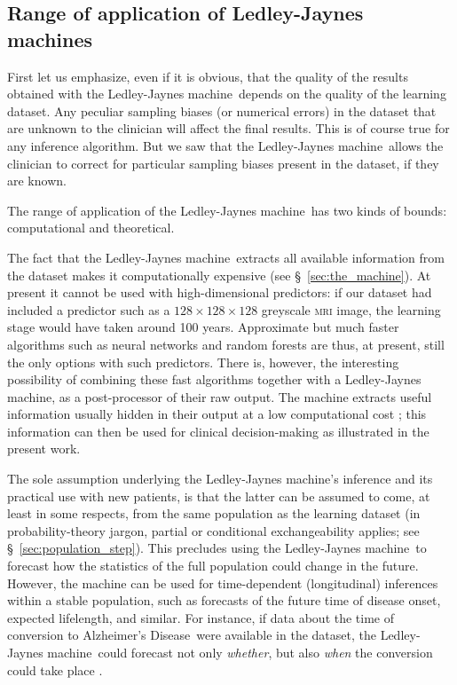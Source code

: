 \documentclass[utf8]{FrontiersinHarvard} %
\newcommand*{\sect}{\S}%
\newcommand*{\eg}{{e.g.}}
\newcommand*{\cf}{{cf.}}
\renewcommand*{\|}[1][]{\nonscript\:#1\vert\nonscript\:\mathopen{}}
\newcommand*{\ad}{Alzheimer's Disease}
\newcommand*{\ljm}{Ledley-Jaynes machine}
\begin{document}
\subsection{Range of application of \ljm s}
\label{sec:rangeLJM}

First let us emphasize, even if it is obvious, that the quality of the results obtained with the \ljm\ depends on the quality of the learning dataset. Any peculiar sampling biases (or numerical errors) in the dataset that are unknown to the clinician will affect the final results. This is of course true for any inference algorithm. But we saw that the \ljm\ allows the clinician to correct for particular sampling biases present in the dataset, if they are known.

The range of application of the \ljm\ has two kinds of bounds: computational and theoretical.

The fact that the \ljm\ extracts all available information from the dataset makes it computationally expensive (see \sect~\ref{sec:the_machine}). At present it cannot be used with high-dimensional predictors: if our dataset had included a predictor such as a $128\times128\times128$ greyscale \textsc{mri} image, the learning stage would have taken around 100 years. Approximate but much faster algorithms such as neural networks and random forests are thus, at present, still the only options with such predictors. There is, however, the interesting possibility of combining these fast algorithms together with a \ljm, as a post-processor of their raw output. The machine extracts useful information usually hidden in their output at a low computational cost \citep{dyrlandetal2022b}; this information can then be used for clinical decision-making as illustrated in the present work.

The sole assumption underlying the \ljm's inference and its practical use with new patients, is that the latter can be assumed to come, at least in some respects, from the same population as the learning dataset (in probability-theory jargon, partial or conditional exchangeability applies; see \sect~\ref{sec:population_step}). This precludes using the \ljm\ to forecast how the statistics of the full population could change in the future. However, the machine can be used for time-dependent (longitudinal) inferences within a stable population, such as forecasts of the future time of disease onset, expected lifelength, and similar. For instance, if data about the time of conversion to \ad\ were available in the dataset, the \ljm\ could forecast not only \emph{whether}, but also \emph{when} the conversion could take place \citep[\cf\ \eg][]{delacruzmesiaetal2007}.
\end{document}
